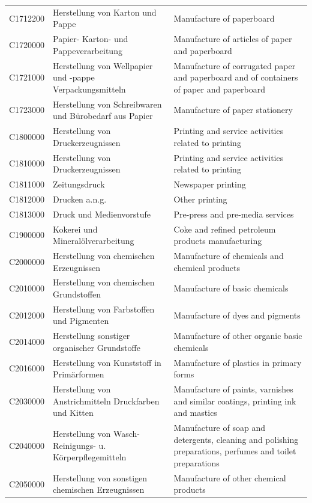 \begin{longtable}{|p{3cm}|p{6cm}|p{6cm}|}
 C1712200   & Herstellung von Karton und Pappe   & Manufacture of paperboard    \\
 C1720000   & Papier- Karton- und Pappeverarbeitung   & Manufacture of articles of paper and paperboard    \\
 C1721000   & Herstellung von Wellpapier und -pappe Verpackungsmitteln   & Manufacture of corrugated paper and paperboard and of containers of paper and paperboard    \\
 C1723000   & Herstellung von Schreibwaren und Bürobedarf aus Papier   & Manufacture of paper stationery    \\
 C1800000   & Herstellung von Druckerzeugnissen   & Printing and service activities related to printing    \\
 C1810000   & Herstellung von Druckerzeugnissen   & Printing and service activities related to printing    \\
 C1811000   & Zeitungsdruck   & Newspaper printing    \\
 C1812000   & Drucken a.n.g.   & Other printing    \\
 C1813000   & Druck und Medienvorstufe   & Pre-press and pre-media services    \\
 C1900000   & Kokerei und Mineralölverarbeitung   & Coke and refined petroleum products manufacturing    \\
 C2000000   & Herstellung von chemischen Erzeugnissen   & Manufacture of chemicals and chemical products    \\
 C2010000   & Herstellung von chemischen Grundstoffen   & Manufacture of basic chemicals    \\
 C2012000   & Herstellung von Farbstoffen und Pigmenten   & Manufacture of dyes and pigments    \\
 C2014000   & Herstellung sonstiger organischer Grundstoffe   & Manufacture of other organic basic chemicals    \\
 C2016000   & Herstellung von Kunststoff in Primärformen   & Manufacture of plastics in primary forms    \\
 C2030000   & Herstellung von Anstrichmitteln Druckfarben und Kitten   & Manufacture of paints, varnishes and similar coatings, printing ink and mastics    \\
 C2040000   & Herstellung von Wasch- Reinigungs- u. Körperpflegemitteln   & Manufacture of soap and detergents, cleaning and polishing preparations, perfumes and toilet preparations    \\
 C2050000   & Herstellung von sonstigen chemischen Erzeugnissen    & Manufacture of other chemical products    \\

\end{longtable}
